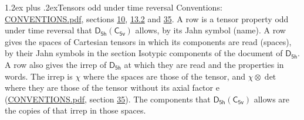 \documentclass[10pt,a4paper]{article}
\makeatletter
\renewcommand\section{\@startsection{section}{1}{\z@}{-3ex plus -1ex minus -.2ex}%
  {1.2ex plus .2ex}{\normalfont\large\sffamily\bfseries\color{parttitle}}}
\numberwithin{equation}{section}
\newcommand{\grp}[1]{\mathsf{#1}}
\newcommand{\irrprod}{\otimes}
\makeatother
\begin{document}
\section{Tensors odd under time reversal}\label{s:time_odd}
Conventions: \href{../../CONVENTIONS.pdf}{CONVENTIONS.pdf}, sections \href{../../../rotation/CONVENTIONS.pdf\#conv.10}{10}, \href{../../../rotation/CONVENTIONS.pdf\#conv.13.2}{13.2} and \href{../../CONVENTIONS.pdf\#conv.35}{35}.
\leavevmode\label{n:head.name.property}A row is a tensor property odd under time reversal that $\grp{D_{5h}}(\grp{C_{5v}})$ allows, by its Jahn symbol (name). \label{n:head.spaces}A row gives the spaces of Cartesian tensors in which its components are read (spaces), by their Jahn symbols in the section Isotypic components of the document of \href{../../../rotation/data/pdf/D5h.pdf}{$\grp{D_{5h}}$}. \label{n:head.properties}A row also gives the irrep of $\grp{D_{5h}}$ at which they are read and the properties in words. The irrep is $\chi$ where the spaces are those of the tensor, and $\chi \irrprod \det$ where they are those of the tensor without its axial factor e (\href{../../CONVENTIONS.pdf}{CONVENTIONS.pdf}, section \href{../../CONVENTIONS.pdf\#conv.35}{35}). The components that $\grp{D_{5h}}(\grp{C_{5v}})$ allows are the copies of that irrep in those spaces.
\end{document}
